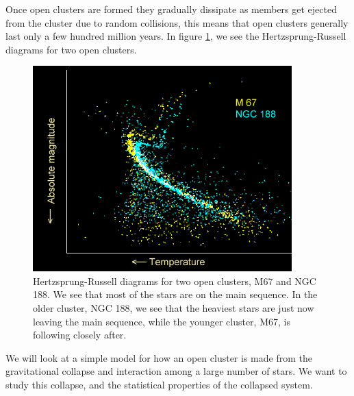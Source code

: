 \documentclass[11pt,a4wide]{article}
\begin{document}
Once open clusters are formed they gradually dissipate as members get
ejected from the cluster due to random collisions, this means that
open clusters generally last only a few hundred million years. In
figure \ref{HR}, we see the Hertzsprung-Russell diagrams for two open
clusters.

\begin{figure}[!h]
\centering
\includegraphics[width=10cm]{FigAstro/open_cluster_hr_diagram_ages.png}
\caption{Hertzsprung-Russell diagrams for two open clusters, M67 and
  NGC 188. We see that most of the stars are on the main sequence. In
  the older cluster, NGC 188, we see that the heaviest stars are just
  now leaving the main sequence, while the younger cluster, M67, is
  following closely after.}
\label{HR}
\end{figure}

We will look at a simple model for how an open cluster is made from
the gravitational collapse and interaction among a large number of
stars. We want to study this collapse, and the statistical properties
of the collapsed system.
\end{document}
